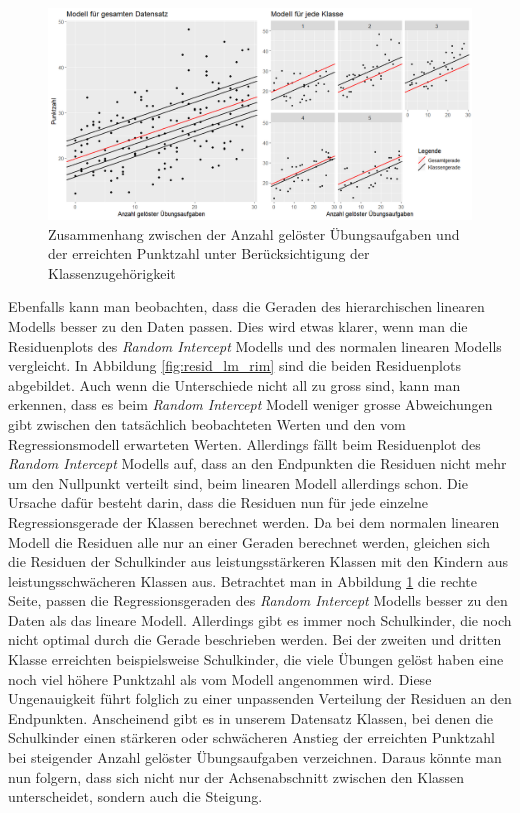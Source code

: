 \documentclass[12pt]{article}\usepackage[]{graphicx}\usepackage[]{color}
\numberwithin{equation}{section}
\begin{document}
\begin{figure}[t!]
\centering
\includegraphics[width = \textwidth]{random_intercept}
\caption{Zusammenhang zwischen der Anzahl gelöster Übungsaufgaben und der erreichten Punktzahl unter Berücksichtigung der Klassenzugehörigkeit}
\label{fig:random_intercept}
\end{figure}

Ebenfalls kann man beobachten, dass die Geraden des hierarchischen linearen Modells besser zu den Daten passen. Dies wird etwas klarer, wenn man die Residuenplots des \textit{Random Intercept} Modells und des normalen linearen Modells vergleicht. In Abbildung \ref{fig:resid_lm_rim} sind die beiden Residuenplots abgebildet. Auch wenn die Unterschiede nicht all zu gross sind, kann man erkennen, dass es beim \textit{Random Intercept} Modell weniger grosse Abweichungen gibt zwischen den tatsächlich beobachteten Werten und den vom Regressionsmodell erwarteten Werten. Allerdings fällt beim Residuenplot des \textit{Random Intercept} Modells auf, dass an den Endpunkten die Residuen nicht mehr um den Nullpunkt verteilt sind, beim linearen Modell allerdings schon. Die Ursache dafür besteht darin, dass die Residuen nun für jede einzelne Regressionsgerade der Klassen berechnet werden. Da bei dem normalen linearen Modell die Residuen alle nur an einer Geraden berechnet werden, gleichen sich die Residuen der Schulkinder aus leistungsstärkeren Klassen mit den Kindern aus leistungsschwächeren Klassen aus. Betrachtet man in Abbildung \ref{fig:random_intercept} die rechte Seite, passen die Regressionsgeraden des \textit{Random Intercept} Modells besser zu den Daten als das lineare Modell. Allerdings gibt es immer noch Schulkinder, die noch nicht optimal durch die Gerade beschrieben werden. Bei der zweiten und dritten Klasse erreichten beispielsweise Schulkinder, die viele Übungen gelöst haben eine noch viel höhere Punktzahl als vom Modell angenommen wird. Diese Ungenauigkeit führt folglich zu einer unpassenden Verteilung der Residuen an den Endpunkten. Anscheinend gibt es in unserem Datensatz Klassen, bei denen die Schulkinder einen stärkeren oder schwächeren Anstieg der erreichten Punktzahl bei steigender Anzahl gelöster Übungsaufgaben verzeichnen. Daraus könnte man nun folgern, dass sich nicht nur der Achsenabschnitt zwischen den Klassen unterscheidet, sondern auch die Steigung.
\end{document}
